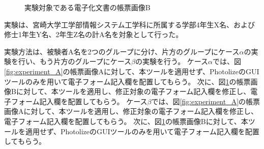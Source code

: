 \begin{figure}[t]
    \begin{center}
        \caption{実験対象である電子化文書の帳票画像B}
        \label{fig:experiment_B}
    \end{center}
\end{figure}

実験は、宮崎大学工学部情報システム工学科に所属する学部4年生X名、および修士1年生Y名、2年生Z名の計A名を対象として行った。

実験方法は、被験者A名を2つのグループに分け、片方のグループにケース$\alpha$の実験を行い、もう片方のグループにケース$\beta$の実験を行う。
ケース$\alpha$では、図\ref{fig:experiment_A}の帳票画像Aに対して、本ツールを適用せず、PhotolizeのGUIツールのみを用いて電子フォーム記入欄を配置してもらう。
次に、図\ref{fig:experiment_B}の帳票画像Bに対して、本ツールを適用し、修正対象の電子フォーム記入欄を修正し、電子フォーム記入欄を配置してもらう。
ケース$\beta$では、図\ref{fig:experiment_A}の帳票画像Aに対して、本ツールを適用し、修正対象の電子フォーム記入欄を修正し、電子フォーム記入欄を配置してもらう。
次に、図\ref{fig:experiment_B}の帳票画像Bに対して、本ツールを適用せず、PhotolizeのGUIツールのみを用いて電子フォーム記入欄を配置してもらう。

